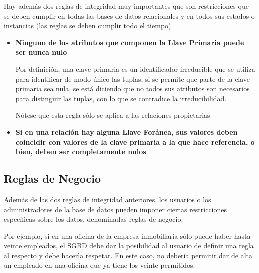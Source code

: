 \documentclass[12pt, fleqn]{report}                             %
\theoremstyle{break}                                            %
\begin{document}
                Hay además dos reglas de integridad muy importantes que son restricciones que se
                deben cumplir en todas las bases de datos relacionales y en todos sus estados o
                instancias (las reglas se deben cumplir todo el tiempo). 


                \begin{itemize}
                    \item
                        \textbf{Ninguno de los atributos que componen la Llave Primaria
                        puede ser nunca nulo}

                        Por definición, una clave primaria es un identificador irreducible que se 
                        utiliza para identificar de modo único las tuplas, si se permite que parte
                        de la clave primaria sea nula, se está diciendo que no todos sus atributos
                        son necesarios para distinguir las tuplas, con lo que se contradice la
                        irreducibilidad.

                        Nótese que esta regla sólo se aplica a las relaciones propietarias


                    \item
                        \textbf{Si en una relación hay alguna Llave Foránea, sus valores deben
                        coincidir con valores de la clave primaria a la que hace referencia, o bien,
                        deben ser completamente nulos}

                \end{itemize}


            \subsection{Reglas de Negocio}

                Además de las dos reglas de integridad anteriores, los usuarios o los administradores
                de la base de datos pueden imponer ciertas restricciones específicas sobre los datos,
                denominadas reglas de negocio.

                Por ejemplo, si en una oficina de la empresa inmobiliaria sólo puede haber hasta veinte
                empleados, el SGBD debe dar la posibilidad al usuario de definir una regla al respecto
                y debe hacerla respetar.
                En este caso, no debería permitir dar de alta un empleado en una oficina que ya tiene
                los veinte permitidos.
\end{document}
